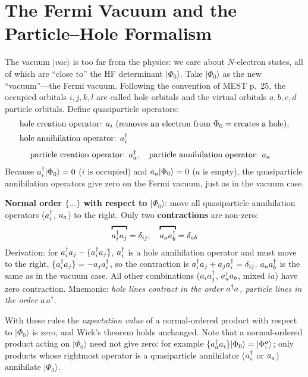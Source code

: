 \section{The Fermi Vacuum and the Particle--Hole Formalism}

The vacuum $|vac\rangle$ is too far from the physics: we care about $N$-electron states, all of which are ``close to'' the HF determinant $|\Phi_0\rangle$. Take $|\Phi_0\rangle$ as the new ``vacuum''---the Fermi vacuum. Following the convention of MEST p.~25, the occupied orbitals $i, j, k, l$ are called hole orbitals and the virtual orbitals $a, b, c, d$ particle orbitals. Define quasiparticle operators:
\begin{align*}
&\text{hole creation operator: } a_i \ \text{(removes an electron from } \Phi_0 = \text{creates a hole)}, \\
&\text{hole annihilation operator: } a^{\dagger}_{i}
\end{align*}
\begin{align*}
&\text{particle creation operator: } a^{\dagger}_{a}, \quad \text{particle annihilation operator: } a_a
\end{align*}
Because $a^{\dagger}_{i} |\Phi_0\rangle = 0$ ($i$ is occupied) and $a_{a} |\Phi_0\rangle = 0$ ($a$ is empty), the quasiparticle annihilation operators give zero on the Fermi vacuum, just as in the vacuum case.

\textbf{Normal order $\{ \dots \}$ with respect to $|\Phi_0\rangle$}: move all quasiparticle annihilation operators ($a^{\dagger}_{i}$, $a_{a}$) to the right. Only two \textbf{contractions} are non-zero:
\begin{align*}
\contraction{\cre{i} a_j} = \delta_{ij}, \quad \contraction{a_a \cre{b}} = \delta_{ab}
\end{align*}
Derivation: for $a^{\dagger}_{i} a_{j} - \{a^{\dagger}_{i} a_{j}\}$, $a^{\dagger}_{i}$ is a hole annihilation operator and must move to the right, $\{a^{\dagger}_{i} a_{j}\} = -a_{j} a^{\dagger}_{i}$, so the contraction is $a^{\dagger}_{i} a_{j} + a_{j} a^{\dagger}_{i} = \delta_{ij}$. $a_{a} a^{\dagger}_{b}$ is the same as in the vacuum case. All other combinations ($a_{i} a^{\dagger}_{j}$, $a^{\dagger}_{a} a_{b}$, mixed $i a$) have zero contraction. Mnemonic: \emph{hole lines contract in the order $a_{}^\dagger a_{}$, particle lines in the order $a\, a^\dagger$.}

With these rules the \emph{expectation value} of a normal-ordered product with respect to $|\Phi_0\rangle$ is zero, and Wick's theorem holds unchanged. Note that a normal-ordered product acting on $|\Phi_0\rangle$ need not give zero: for example $\{a^{\dagger}_{a} a_i\}|\Phi_0\rangle = |\Phi_i^a\rangle$; only products whose rightmost operator is a quasiparticle annihilator ($a^{\dagger}_{i}$ or $a_{a}$) annihilate $|\Phi_0\rangle$.

